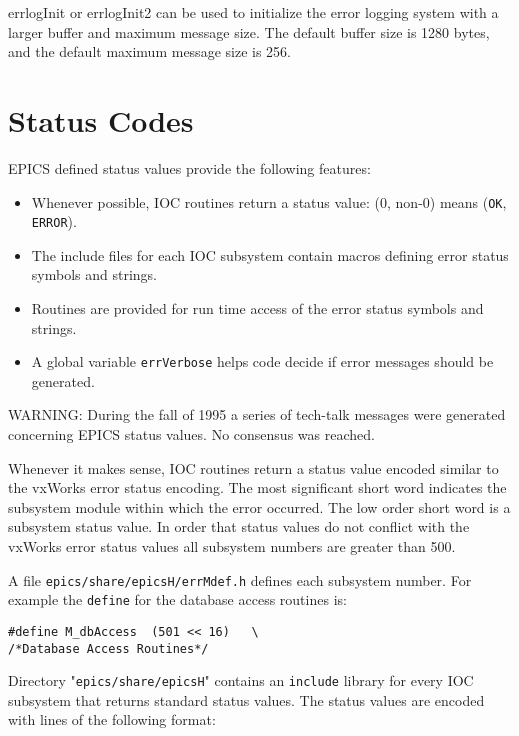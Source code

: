 errlogInit or errlogInit2 can be used to initialize the error logging system with a larger buffer and maximum message size. 
The default buffer size is 1280 bytes, and the default maximum message size is 256.

\section{Status Codes}

EPICS defined status values provide the following features:

\begin{itemize}\item Whenever possible, IOC routines return a status value: (0, non-0) means (\verb|OK|, \verb|ERROR|).

\item The include files for each IOC subsystem contain macros defining error status symbols and strings.

\item Routines are provided for run time access of the error status symbols and strings.

\item A global variable \verb|errVerbose| helps code decide if error messages should be generated.

\end{itemize}WARNING: During the fall of 1995 a series of tech-talk messages were generated concerning EPICS status values. No 
consensus was reached.

Whenever it makes sense, IOC routines return a status value encoded similar to the vxWorks error status encoding. The 
most significant short word indicates the subsystem module within which the error occurred. The low order short word is 
a subsystem status value. In order that status values do not conflict with the vxWorks error status values all subsystem 
numbers are greater than 500. 

A file \verb|epics/share/epicsH/errMdef.h| defines each subsystem number. For example the \verb|define| for the 
database access routines is:

\begin{verbatim}#define M_dbAccess  (501 << 16)   \
/*Database Access Routines*/
\end{verbatim}Directory "\verb|epics/share/epicsH|" contains an \verb|include| library for every IOC subsystem that returns standard status 
values. The status values are encoded with lines of the following format: 


